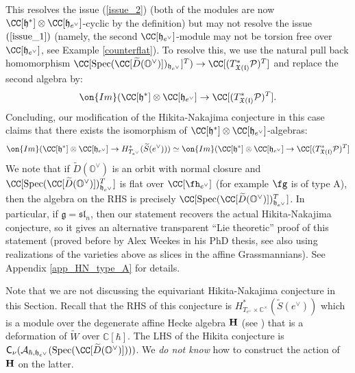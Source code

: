 \documentclass[12pt]{amsart}
\begin{document}
This resolves the issue (\ref{issue_2}) (both of the modules are now $\CC[\mathfrak{h}^*] \otimes \CC[\mathfrak{h}_{e^\vee}]$-cyclic by the definition) but may not resolve the issue $(\ref{issue_1})$ (namely, the second $\CC[\mathfrak{h}_{e^\vee}]$-module may not be torsion free over $\CC[\mathfrak{h}_{e^\vee}]$, see Example \ref{counterflat}). To resolve this, we use the natural pull back homomorphism $\CC[\operatorname{Spec}(\CC[\widetilde{D}(\mathbb{O}^\vee)])_{\mathfrak{h}_{e^\vee}}]^{T}) \rightarrow \CC[(T^*_{\mathfrak{X}(\mathfrak{l})}\mathcal{P})^{T}]$ and replace the second algebra by:
\begin{equation*}
\on{Im}(\CC[\mathfrak{h}^*] \otimes \CC[\mathfrak{h}_{e^\vee}] \rightarrow \CC[(T^*_{\mathfrak{X}(\mathfrak{l})}\mathcal{P})^{T}].
\end{equation*}
Concluding, our modification of the Hikita-Nakajima conjecture in this case claims that there exists the  isomorphism of $\CC[\mathfrak{h}^*] \otimes \CC[\mathfrak{h}_{e^\vee}]$-algebras:
\begin{equation*}
 \on{Im}(\CC[\mathfrak{h}^*] \otimes \CC[\mathfrak{h}_{e^\vee}] \rightarrow H^*_{T_{e^\vee}}(\widetilde{S}(e^\vee))) \simeq  \on{Im}(\CC[\mathfrak{h}^*] \otimes \CC[\mathfrak{h}_{e^\vee}] \rightarrow \CC[(T^*_{\mathfrak{X}(\mathfrak{l})}\mathcal{P})^{T}]
\end{equation*}
We note that if $\widetilde{D}(\mathbb{O}^\vee)$ is an orbit with normal closure and $\CC[\operatorname{Spec}(\CC[\widetilde{D}(\mathbb{O}^\vee)])_{\mathfrak{h}_{e^\vee}}^{T}]$ is flat over $\CC[\fh_{e^\vee}]$ (for example $\fg$ is of type A), then the algebra on the RHS is precisely $\CC[\operatorname{Spec}(\CC[\widetilde{D}(\mathbb{O}^\vee)])_{\mathfrak{h}_{e^\vee}}^{T}]$. In particular, if $\mathfrak{g}=\mathfrak{sl}_n$, then our statement recovers the actual Hikita-Nakajima conjecture, so it gives an alternative transparent ``Lie theoretic'' proof of this statement (proved before by Alex Weekes in his PhD thesis, see also \cite{KamnitzerTingleyWebsterWeeksYacobi} using realizations of the varieties above as slices in the affine Grassmannians). See Appendix \ref{app_HN_type_A} for details. 

\begin{rmk}
Note that we are not discussing the equivariant Hikita-Nakajima conjecture in this Section. Recall that the RHS of this conjecture is $H^*_{T_{e^\vee} \times \mathbb{C}^\times}(\widetilde{S}(e^\vee))$ which is a module over the degenerate affine Hecke algebra ${\bf{H}}$ (see \cite[Section 0.1]{lusztig_cuspidalI}) that is a deformation of $\widetilde{W}$ over $\mathbb{C}[\hbar]$. The LHS of the Hikita conjecture is $\mathsf{C}_\nu(\mathcal{A}_{\hbar,\mathfrak{h}_{e^\vee}}(\operatorname{Spec}(\CC[\widetilde{D}(\mathbb{O}^\vee)])))$. We {\emph{do not know}} how to construct the action of ${\bf{H}}$  on the latter.
\end{rmk}
\end{document}
